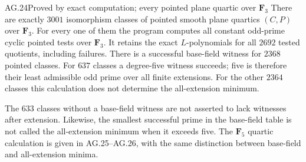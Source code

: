 \begin{claim}{AG.24}{Proved by exact computation; every pointed plane quartic over $\mathbf F_3$}
There are exactly $3001$ isomorphism classes of pointed
smooth plane quartics $(C,P)$ over $\mathbf F_3$.
For every one of them the program
 computes all constant
odd-prime cyclic pointed tests over $\mathbf F_3$.
It retains the exact $L$-polynomials for all $2692$ tested
quotients, including failures. There is a successful
base-field witness for $2368$ pointed classes.
For $637$ classes a degree-five witness succeeds; five is
therefore their least admissible odd prime over all finite
extensions. For the other $2364$ classes this calculation
does not determine the all-extension minimum.

The $633$ classes without a base-field witness are not
asserted to lack witnesses after extension. Likewise,
the smallest successful prime in the base-field table
is not called the all-extension minimum when it exceeds
five. The $\mathbf F_5$ quartic calculation is given in
AG.25--AG.26, with the same distinction between base-field
and all-extension minima.
\end{claim}
